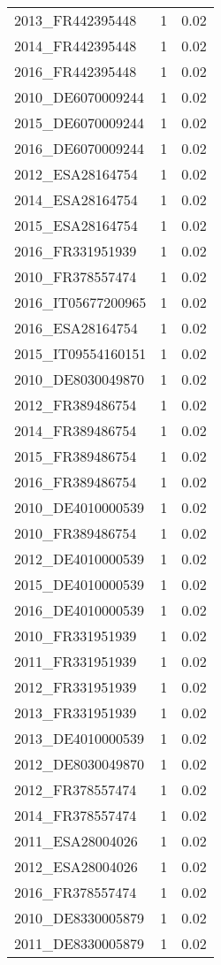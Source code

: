 \begin{table*}[htbp]
\begin{tabular}{lrr}
2013_FR442395448 & 1 & 0.02 \\
2014_FR442395448 & 1 & 0.02 \\
2016_FR442395448 & 1 & 0.02 \\
2010_DE6070009244 & 1 & 0.02 \\
2015_DE6070009244 & 1 & 0.02 \\
2016_DE6070009244 & 1 & 0.02 \\
2012_ESA28164754 & 1 & 0.02 \\
2014_ESA28164754 & 1 & 0.02 \\
2015_ESA28164754 & 1 & 0.02 \\
2016_FR331951939 & 1 & 0.02 \\
2010_FR378557474 & 1 & 0.02 \\
2016_IT05677200965 & 1 & 0.02 \\
2016_ESA28164754 & 1 & 0.02 \\
2015_IT09554160151 & 1 & 0.02 \\
2010_DE8030049870 & 1 & 0.02 \\
2012_FR389486754 & 1 & 0.02 \\
2014_FR389486754 & 1 & 0.02 \\
2015_FR389486754 & 1 & 0.02 \\
2016_FR389486754 & 1 & 0.02 \\
2010_DE4010000539 & 1 & 0.02 \\
2010_FR389486754 & 1 & 0.02 \\
2012_DE4010000539 & 1 & 0.02 \\
2015_DE4010000539 & 1 & 0.02 \\
2016_DE4010000539 & 1 & 0.02 \\
2010_FR331951939 & 1 & 0.02 \\
2011_FR331951939 & 1 & 0.02 \\
2012_FR331951939 & 1 & 0.02 \\
2013_FR331951939 & 1 & 0.02 \\
2013_DE4010000539 & 1 & 0.02 \\
2012_DE8030049870 & 1 & 0.02 \\
2012_FR378557474 & 1 & 0.02 \\
2014_FR378557474 & 1 & 0.02 \\
2011_ESA28004026 & 1 & 0.02 \\
2012_ESA28004026 & 1 & 0.02 \\
2016_FR378557474 & 1 & 0.02 \\
2010_DE8330005879 & 1 & 0.02 \\
2011_DE8330005879 & 1 & 0.02 \\

\end{tabular}
\end{table*}
